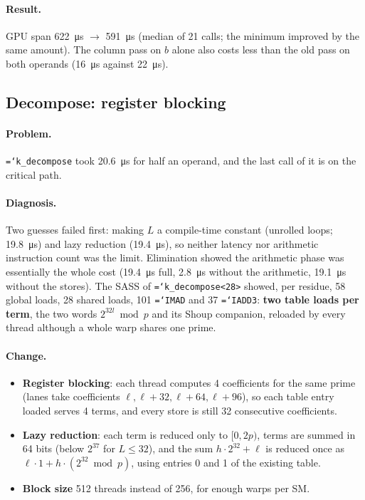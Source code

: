 \documentclass[11pt,a4paper]{article}
\newcommand{\code}[1]{\texttt{\hyphenchar\font=`\-\relax #1}}
\newcommand{\us}[1]{\SI{#1}{\micro\second}}
\begin{document}
\paragraph{Result.} GPU span \us{622} $\to$ \us{591} (median of 21 calls; the minimum
improved by the same amount). The column pass on $b$ alone also costs less than the
old pass on both operands (\us{16} against \us{22}).

\subsection{Decompose: register blocking}

\paragraph{Problem.} \code{k\_decompose} took \us{20.6} for half an operand, and the
last call of it is on the critical path.

\paragraph{Diagnosis.} Two guesses failed first: making $L$ a compile-time constant
(unrolled loops; \us{19.8}) and lazy reduction (\us{19.4}), so neither latency nor
arithmetic instruction count was the limit. Elimination showed the arithmetic phase
was essentially the whole cost (\us{19.4} full, \us{2.8} without the arithmetic,
\us{19.1} without the stores). The SASS of \code{k\_decompose<28>} showed, per residue,
58 global loads, 28 shared loads, 101 \code{IMAD} and 37 \code{IADD3}: \textbf{two
table loads per term}, the two words $2^{32l} \bmod p$ and its Shoup companion,
reloaded by every thread although a whole warp shares one prime.

\paragraph{Change.}
\begin{itemize}[leftmargin=*]
\item \textbf{Register blocking}: each thread computes 4 coefficients for the same
  prime (lanes take coefficients $\ell, \ell+32, \ell+64, \ell+96$), so each table
  entry loaded serves 4 terms, and every store is still 32 consecutive coefficients.
\item \textbf{Lazy reduction}: each term is reduced only to $[0, 2p)$, terms are summed
  in 64 bits (below $2^{37}$ for $L \le 32$), and the sum $h \cdot 2^{32} + \ell$ is
  reduced once as $\ell \cdot 1 + h \cdot (2^{32} \bmod p)$, using entries 0 and 1 of
  the existing table.
\item \textbf{Block size} 512 threads instead of 256, for enough warps per SM.
\end{itemize}
\end{document}
